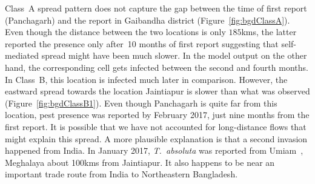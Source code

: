 \documentclass[11pt]{article}
\newcommand{\tuta}{\emph{T.~absoluta}}
\newcommand{\aacomment}[1]{({\color{magenta}AA: #1})}
\theoremstyle{definition}
\begin{document}

Class~A spread pattern does not capture the gap between the time of first
report (Panchagarh) and the report in Gaibandha district
(Figure~\ref{fig:bgdClassA}). Even though the distance between the two
locations is only $185$kms, the latter reported the presence only after~10
months of first report suggesting that self-mediated spread might have been
much slower. In the model output on the other hand, the corresponding cell
gets infected between the second and fourth months.  In Class~B, this
location is infected much later in comparison. However, the eastward spread
towards the location Jaintiapur is slower than what was observed
(Figure~\ref{fig:bgdClassB1}). Even though Panchagarh is quite far from
this location, pest presence was reported by February 2017, just nine
months from the first report. It is possible that we have not accounted for
long-distance flows that might explain this spread. A more plausible
explanation is that a second invasion happened from India. In January 2017,
\tuta{} was reported from Umiam~\cite{sankarganesh2017}, Meghalaya about
100kms from Jaintiapur.  It also happens to be near an important trade
route from India to Northeastern Bangladesh.
\end{document}
